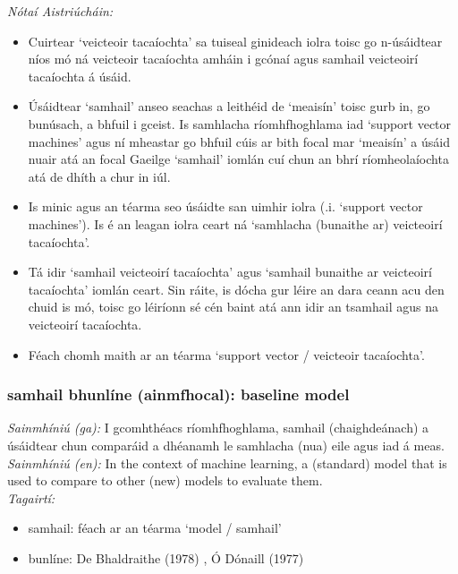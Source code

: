  \noindent \textit{Nótaí Aistriúcháin:}
\begin{itemize}
	\item Cuirtear `veicteoir tacaíochta' sa tuiseal ginideach iolra toisc go n-úsáidtear níos mó ná veicteoir tacaíochta amháin i gcónaí agus samhail veicteoirí tacaíochta á úsáid.
	\item Úsáidtear `samhail' anseo seachas a leithéid de `meaisín' toisc gurb in, go bunúsach, a bhfuil i gceist. Is samhlacha ríomhfhoghlama iad `support vector machines' agus ní mheastar go bhfuil cúis ar bith focal mar `meaisín' a úsáid nuair atá an focal Gaeilge `samhail' iomlán cuí chun an bhrí ríomheolaíochta atá de dhíth a chur in iúl.
	\item Is minic agus an téarma seo úsáidte san uimhir iolra (.i. `support vector machines'). Is é an leagan iolra ceart ná `samhlacha (bunaithe ar) veicteoirí tacaíochta'.
	\item Tá idir `samhail veicteoirí tacaíochta' agus `samhail bunaithe ar veicteoirí tacaíochta' iomlán ceart. Sin ráite, is dócha gur léire an dara ceann acu den chuid is mó, toisc go léiríonn sé cén baint atá ann idir an tsamhail agus na veicteoirí tacaíochta.
	\item Féach chomh maith ar an téarma `support vector / veicteoir tacaíochta'.
\end{itemize}


\subsubsection*{samhail bhunlíne (ainmfhocal): baseline model}
 \noindent \textit{Sainmhíniú (ga):} I gcomhthéacs ríomhfhoghlama, samhail (chaighdeánach) a úsáidtear chun comparáid a dhéanamh le samhlacha (nua) eile agus iad á meas.
\\
 \noindent \textit{Sainmhíniú (en):} In the context of machine learning, a (standard) model that is used to compare to other (new) models to evaluate them.
\\
 \noindent \textit{Tagairtí:}
\begin{itemize}
	\item samhail: féach ar an téarma `model / samhail'
	\item bunlíne: De Bhaldraithe (1978) \cite{de-bhaldraithe}, Ó Dónaill (1977) \cite{odonaill}
\end{itemize}

